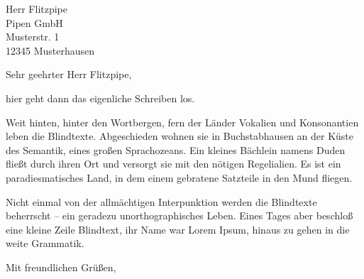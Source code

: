 \documentclass[absender]{scrlttr2}
\begin{document}



\begin{letter}{
    Herr Flitzpipe\\
    Pipen GmbH\\
    Musterstr. 1\\
    12345 Musterhausen
}
\opening{Sehr geehrter Herr Flitzpipe,}

hier geht dann das eigenliche Schreiben los.

Weit hinten, hinter den Wortbergen, fern der Länder Vokalien und Konsonantien leben die Blindtexte. Abgeschieden wohnen sie in Buchstabhausen an der Küste des Semantik, eines großen Sprachozeans. Ein kleines Bächlein namens Duden fließt durch ihren Ort und versorgt sie mit den nötigen Regelialien. Es ist ein paradiesmatisches Land, in dem einem gebratene Satzteile in den Mund fliegen.

Nicht einmal von der allmächtigen Interpunktion werden die Blindtexte beherrscht – ein geradezu unorthographisches Leben. Eines Tages aber beschloß eine kleine Zeile Blindtext, ihr Name war Lorem Ipsum, hinaus zu gehen in die weite Grammatik.

\closing{Mit freundlichen Grüßen,}
\end{letter}
\end{document}
